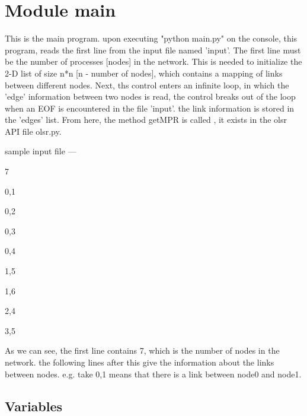 %
%
%


\section{Module main}

    \label{main}
This is the main program. upon executing "python main.py" on the console, 
this program, reads the first line from the input file named 'input'. The 
first line must be the number of processes [nodes] in the network. This is 
needed to initialize the 2-D list of size n*n [n - number of nodes], which 
contains a mapping of links between different nodes. Next, ths control 
enters an infinite loop, in which the 'edge' information between two nodes 
is read, the control breaks out of the loop when an EOF is encountered in 
the file 'input'. the link information is stored in the 'edges' list. From 
here, the method getMPR is called , it exists in the olsr API file olsr.py.

sample input file ---

7

0,1

0,2

0,3

0,4

1,5

1,6

2,4

3,5

As we can see, the first line contains 7, which is the number of nodes in 
the network. the following lines after this give the information about the 
links between nodes. e.g. take 0,1 means that there is a link between node0
and node1.



  \subsection{Variables}

